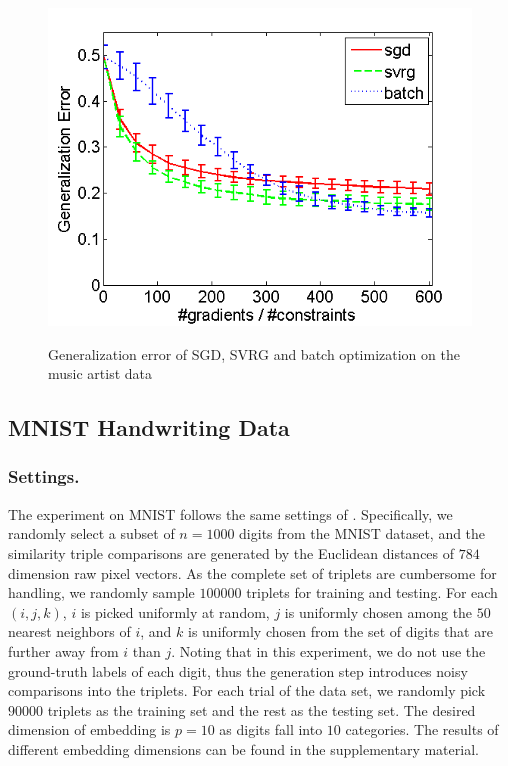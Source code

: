 \documentclass[letterpaper]{article}
\begin{document}
\begin{figure}
{				\includegraphics[scale=0.33]{Music_TSTE_200_test.png}
			}
			\caption{Generalization error of SGD, SVRG and batch optimization on the music artist data}
			\label{fig:3} %
		\end{figure}

		\subsection{MNIST Handwriting Data}
		\subsubsection{Settings.}
		The experiment on MNIST follows the same settings of \cite{vandermaaten2012stochastic}. Specifically, we randomly select a subset of $n=1000$ digits from the MNIST dataset, and the similarity triple comparisons are generated by the Euclidean distances of $784$ dimension raw pixel vectors. As the complete set of triplets are cumbersome for handling, we randomly sample $100000$ triplets for training and testing. For each $(i, j, k)$, $i$ is picked uniformly at random, $j$ is uniformly chosen among the $50$ nearest neighbors of $i$, and $k$ is uniformly chosen from the set of digits that are further away from $i$ than $j$. Noting that in this experiment, we do not use the ground-truth labels of each digit, thus the generation step introduces noisy comparisons into the triplets. For each trial of the data set, we randomly pick $90000$ triplets as the training set and the rest as the testing set. The desired dimension of embedding is $p = 10$ as digits fall into $10$ categories. The results of different embedding dimensions can be found in the supplementary material.
\end{document}
